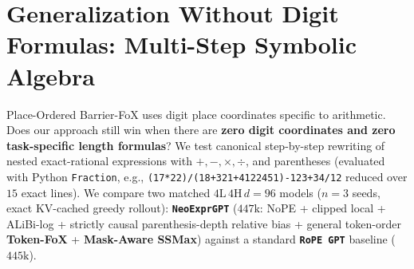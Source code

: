 \documentclass[10pt]{article}
\begin{document}
\section{Generalization Without Digit Formulas: Multi-Step Symbolic Algebra}
\label{sec:expr}

Place-Ordered Barrier-FoX uses digit place coordinates specific to arithmetic. Does our approach still win when there are \textbf{zero digit coordinates and zero task-specific length formulas}? We test canonical step-by-step rewriting of nested exact-rational expressions with $+, -, \times, \div$, and parentheses (evaluated with Python \texttt{Fraction}, e.g., \texttt{(17*22)/(18+321+4122451)-123+34/12} reduced over $15$ exact lines). We compare two matched $4\text{L}\,4\text{H}\,d=96$ models ($n=3$ seeds, exact KV-cached greedy rollout): \textbf{\texttt{NeoExprGPT}} ($447\text{k}$: NoPE + clipped local + ALiBi-log + strictly causal parenthesis-depth relative bias + general token-order \textbf{Token-FoX} + \textbf{Mask-Aware SSMax}) against a standard \textbf{\texttt{RoPE GPT}} baseline ($445\text{k}$).
\end{document}
